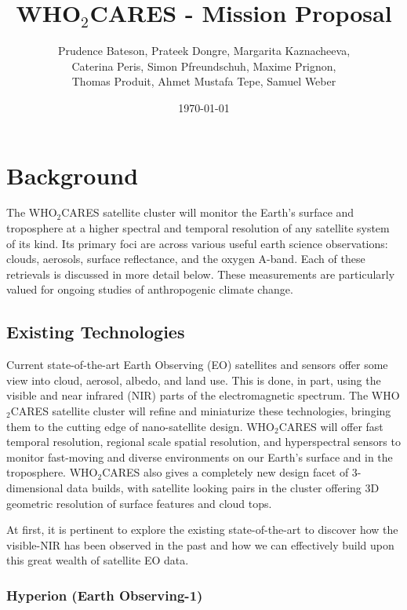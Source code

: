 \documentclass{scrartcl}
\author{Prudence Bateson, Prateek Dongre, Margarita Kaznacheeva,\\ Caterina Peris, Simon Pfreundschuh, Maxime Prignon,\\  Thomas Produit, Ahmet Mustafa Tepe, Samuel Weber}
\date{\today}
\title{WHO$_2$CARES - Mission Proposal}
\newcommand{\whocares}{WHO$_2$CARES }
\begin{document}
\maketitle

\section{Background}
\label{sec:org1347442}

The \whocares satellite cluster will monitor the Earth’s surface and troposphere
at a higher spectral and temporal resolution of any satellite system of its
kind. Its primary foci are across various useful earth science observations:
clouds, aerosols, surface reflectance, and the oxygen A-band. Each of these
retrievals is discussed in more detail below. These measurements are
particularly valued for ongoing studies of anthropogenic climate change.

\subsection{Existing Technologies}
\label{sec:org43b3706}

Current state-of-the-art Earth Observing (EO) satellites
and sensors offer some view into cloud, aerosol, albedo, and land use. This is
done, in part, using the visible and near infrared (NIR) parts of the
electromagnetic spectrum. The \whocares satellite cluster will refine and
miniaturize these technologies, bringing them to the cutting edge of
nano-satellite design. \whocares will offer fast temporal resolution, regional
scale spatial resolution, and hyperspectral sensors to monitor fast-moving and
diverse environments on our Earth’s surface and in the troposphere. \whocares
also gives a completely new design facet of 3-dimensional data builds, with
satellite looking pairs in the cluster offering 3D geometric resolution of
surface features and cloud tops.

At first, it is pertinent to explore the existing state-of-the-art to discover
how the visible-NIR has been observed in the past and how we can effectively
build upon this great wealth of satellite EO data.

\subsubsection{Hyperion (Earth Observing-1)}
\label{sec:org37e5de5}
\end{document}
